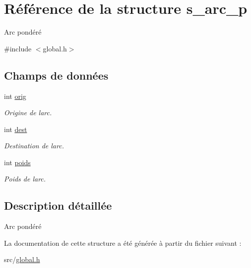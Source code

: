 \hypertarget{structs__arc__p}{}\section{Référence de la structure s\+\_\+arc\+\_\+p}
\label{structs__arc__p}


Arc pondéré  




{\ttfamily \#include $<$global.\+h$>$}

\subsection*{Champs de données}
\begin{DoxyCompactItemize}
\item 
\mbox{\label{structs__arc__p_a9e217f04c0fbbe53b5ad22ba4eb2af25}} 
int \hyperlink{structs__arc__p_a9e217f04c0fbbe53b5ad22ba4eb2af25}{orig}
\begin{DoxyCompactList}\small\item\em Origine de l\textquotesingle{}arc. \end{DoxyCompactList}\item 
\mbox{\label{structs__arc__p_ae5163ff230abd4115d86194ad89467b5}} 
int \hyperlink{structs__arc__p_ae5163ff230abd4115d86194ad89467b5}{dest}
\begin{DoxyCompactList}\small\item\em Destination de l\textquotesingle{}arc. \end{DoxyCompactList}\item 
\mbox{\label{structs__arc__p_ac1abe8fa63a4167cf11ef707f524f0c4}} 
int \hyperlink{structs__arc__p_ac1abe8fa63a4167cf11ef707f524f0c4}{poids}
\begin{DoxyCompactList}\small\item\em Poids de l\textquotesingle{}arc. \end{DoxyCompactList}\end{DoxyCompactItemize}


\subsection{Description détaillée}
Arc pondéré 

La documentation de cette structure a été générée à partir du fichier suivant \+:\begin{DoxyCompactItemize}
\item 
src/\hyperlink{global_8h}{global.\+h}\end{DoxyCompactItemize}
